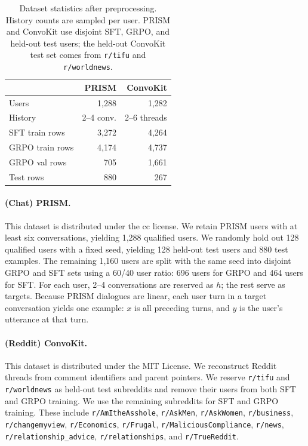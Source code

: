 \documentclass[11pt]{article}
\begin{document}
\begin{table}[h]
\centering
\small
\begin{tabular}{lrr}
\toprule
 & PRISM & ConvoKit \\
\midrule
Users & 1,288 & 1,282 \\
History & 2--4 conv. & 2--6 threads \\
SFT train rows & 3,272 & 4,264 \\
GRPO train rows & 4,174 & 4,737 \\
GRPO val rows & 705 & 1,661 \\
Test rows & 880 & 267 \\
\bottomrule
\end{tabular}
\caption{Dataset statistics after preprocessing. History counts are sampled per user. PRISM and ConvoKit use disjoint SFT, GRPO, and held-out test users; the held-out ConvoKit test set comes from \texttt{r/tifu} and \texttt{r/worldnews}.}
\label{tab:preprocessing_stats}
\end{table}

\paragraph{(Chat) PRISM.}
This dataset is distributed under the cc license. We retain PRISM users with at least six conversations, yielding 1,288 qualified users. We randomly hold out 128 qualified users with a fixed seed, yielding 128 held-out test users and 880 test examples. The remaining 1,160 users are split with the same seed into disjoint GRPO and SFT sets using a 60/40 user ratio: 696 users for GRPO and 464 users for SFT. For each user, 2--4 conversations are reserved as $h$; the rest serve as targets. Because PRISM dialogues are linear, each user turn in a target conversation yields one example: $x$ is all preceding turns, and $y$ is the user's utterance at that turn.

\paragraph{(Reddit) ConvoKit.}
This dataset is distributed under the MIT License. We reconstruct Reddit threads from comment identifiers and parent pointers.
We reserve \texttt{r/tifu} and \texttt{r/worldnews} as held-out test subreddits and remove their users from both SFT and GRPO training.
We use the remaining subreddits for SFT and GRPO training. These include \texttt{r/AmItheAsshole}, \texttt{r/AskMen}, \texttt{r/AskWomen}, \texttt{r/business}, \texttt{r/changemyview}, \texttt{r/Economics}, \texttt{r/Frugal}, \texttt{r/MaliciousCompliance}, \texttt{r/news}, \texttt{r/relationship\_advice}, \texttt{r/relationships}, and \texttt{r/TrueReddit}.
\end{document}
